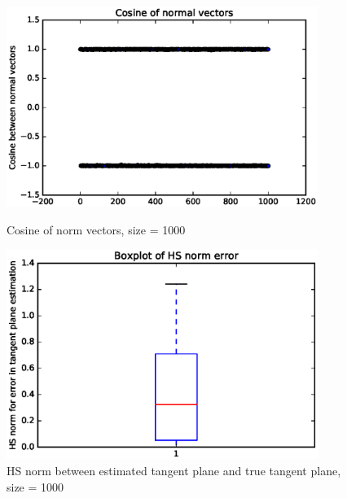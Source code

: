 \documentclass{article}
\begin{document}
\begin{figure}[htbp]
\centering
\begin{minipage}{0.45\textwidth}
\includegraphics[width=0.9\textwidth]{Normcos-size-1000.eps}
\caption{Cosine of norm vectors, size = 1000}
\label{normcos1000}
\end{minipage}
\begin{minipage}{0.45\textwidth}
\includegraphics[width=0.9\textwidth]{HSlpca-size-1000.eps}
\caption{HS norm between estimated tangent plane and true tangent plane, size = 1000}
\label{hsnorm1000}
\end{minipage}
\end{figure}
\end{document}
